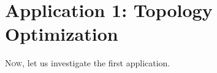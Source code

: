 
\chapter{Application 1: Topology Optimization}

\lettrine{N}{ow,}
let us investigate the first application.
\blindtext{}






\cleardoublepage
